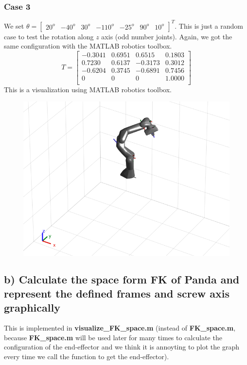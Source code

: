 \documentclass[english,10pt,a4paper]{article}
\begin{document}
    \subsubsection*{Case 3}
    We set $\theta = \begin{bmatrix}
        20^o & -40^o & 30^o & -110^o & -25^o & 90^o & 10^o
    \end{bmatrix}^T$. This is just a random case to test the rotation along $z$ axis (odd number joints). Again, we got the same configuration with the MATLAB robotics toolbox.
    $$T = \begin{bmatrix}
           -0.3041 &   0.6951  & 0.6515  &  0.1803 \\
        0.7230 &   0.6137 &  -0.3173  &  0.3012\\
        -0.6204  &  0.3745  & -0.6891  &  0.7456\\
        0      &   0     &    0  &  1.0000\\
    \end{bmatrix}$$
    This is a visualization using MATLAB robotics toolbox.
    \begin{figure}[H]
        \includegraphics[scale=0.7]{p1t3.png}
    \end{figure}
	
    \subsection*{b) Calculate the space form FK of Panda and represent the defined frames and screw axis graphically}
    This is implemented in \textbf{visualize\_FK\_space.m} (instead of \textbf{FK\_space.m}, because \textbf{FK\_space.m} will be used later for many times to calculate the configuration of the end-effector and we think it is annoyting to plot the graph every time we call the function to get the end-effector).
	
\end{document}
